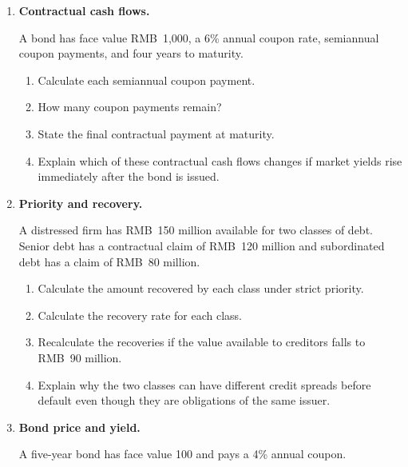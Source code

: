 \begin{enumerate}

\item \textbf{Contractual cash flows.}

A bond has face value RMB~1,000, a 6\% annual coupon rate, semiannual coupon payments, and four years to maturity.

\begin{enumerate}

\item Calculate each semiannual coupon payment.

\item How many coupon payments remain?

\item State the final contractual payment at maturity.

\item Explain which of these contractual cash flows changes if market yields rise immediately after the bond is issued.

\end{enumerate}

\item \textbf{Priority and recovery.}

A distressed firm has RMB~150 million available for two classes of debt. Senior debt has a contractual claim of RMB~120 million and subordinated debt has a claim of RMB~80 million.

\begin{enumerate}

\item Calculate the amount recovered by each class under strict priority.

\item Calculate the recovery rate for each class.

\item Recalculate the recoveries if the value available to creditors falls to RMB~90 million.

\item Explain why the two classes can have different credit spreads before default even though they are obligations of the same issuer.

\end{enumerate}

\item \textbf{Bond price and yield.}

A five-year bond has face value 100 and pays a 4\% annual coupon.

\begin{enumerate}


\end{enumerate}
\end{enumerate}
